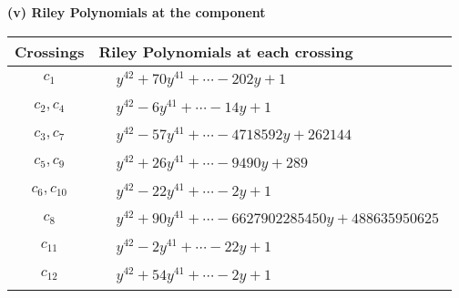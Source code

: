 \documentclass[1p]{elsarticle_modified}
\theoremstyle{definition}
\begin{document}
\newpage\renewcommand{\arraystretch}{1}
\flushleft \textbf{(v) Riley Polynomials at the component}\newline \\
\begin{tabular}{m{50pt}|m{274pt}}
Crossings & \hspace{64pt}Riley Polynomials at each crossing \\
\hline $$\begin{aligned}c_{1}\end{aligned}$$&$\begin{aligned}
&y^{42}+70 y^{41}+\cdots-202 y+1
\end{aligned}$\\
\hline $$\begin{aligned}c_{2},c_{4}\end{aligned}$$&$\begin{aligned}
&y^{42}-6 y^{41}+\cdots-14 y+1
\end{aligned}$\\
\hline $$\begin{aligned}c_{3},c_{7}\end{aligned}$$&$\begin{aligned}
&y^{42}-57 y^{41}+\cdots-4718592 y+262144
\end{aligned}$\\
\hline $$\begin{aligned}c_{5},c_{9}\end{aligned}$$&$\begin{aligned}
&y^{42}+26 y^{41}+\cdots-9490 y+289
\end{aligned}$\\
\hline $$\begin{aligned}c_{6},c_{10}\end{aligned}$$&$\begin{aligned}
&y^{42}-22 y^{41}+\cdots-2 y+1
\end{aligned}$\\
\hline $$\begin{aligned}c_{8}\end{aligned}$$&$\begin{aligned}
&y^{42}+90 y^{41}+\cdots-6627902285450 y+488635950625
\end{aligned}$\\
\hline $$\begin{aligned}c_{11}\end{aligned}$$&$\begin{aligned}
&y^{42}-2 y^{41}+\cdots-22 y+1
\end{aligned}$\\
\hline $$\begin{aligned}c_{12}\end{aligned}$$&$\begin{aligned}
&y^{42}+54 y^{41}+\cdots-2 y+1
\end{aligned}$\\
\hline
\end{tabular}\\~\\
\end{document}
